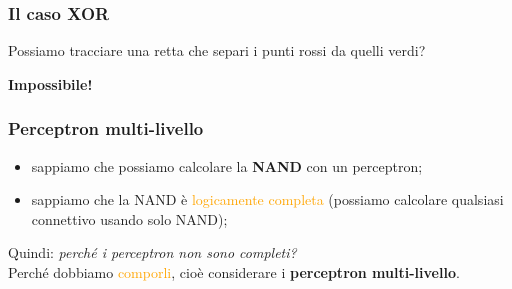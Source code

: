 \documentclass[a4paper,12pt]{article}
\newcommand{\x}{\bm{x}}
\newcommand{\hl}[1]{\textcolor{orange}{#1}}
\begin{document}
\subsubsection{Il caso XOR}
Possiamo tracciare una retta che separi i punti rossi da quelli verdi?
\begin{center}
\end{center}
\textbf{Impossibile!}
\begin{center}
\end{center}

\subsubsection{Perceptron multi-livello}
\begin{itemize}
\item sappiamo che possiamo calcolare la \textbf{NAND} con un perceptron;
\item sappiamo che la NAND è \hl{logicamente completa} (possiamo calcolare qualsiasi connettivo usando solo NAND);
\end{itemize}
Quindi: \textit{perché i perceptron non sono completi?}\\
Perché dobbiamo \hl{comporli}, cioè considerare i \textbf{perceptron multi-livello}.
\end{document}
